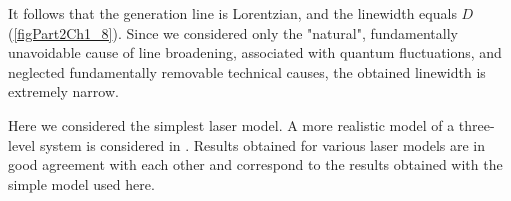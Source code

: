 

It follows that the generation line is Lorentzian, and the linewidth equals $D$ 
(\autoref{figPart2Ch1_8}). Since we considered only the "natural",
fundamentally unavoidable cause of line broadening,
associated with quantum fluctuations, and neglected fundamentally
removable technical causes, the obtained linewidth is
extremely narrow.  

Here we considered the simplest laser model. A more
realistic model of a three-level system is considered in
\cite{bHaken1988}. Results obtained for various laser models
are in good agreement with each other and correspond to the results 
obtained with the simple model used here. 
